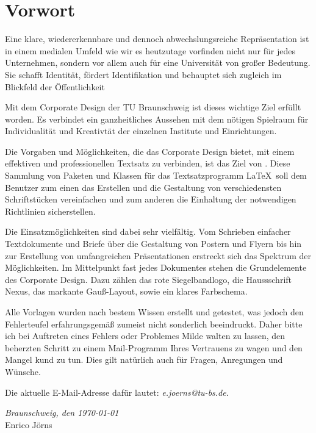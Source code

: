 \chapter*{Vorwort}

Eine klare, wiedererkennbare und dennoch abwechslungsreiche
Repräsentation ist in einem medialen Umfeld wie wir es heutzutage
vorfinden nicht nur für jedes Unternehmen, sondern vor allem auch
für eine Universität von großer Bedeutung.
Sie schafft Identität, fördert Identifikation und behauptet sich zugleich im 
Blickfeld der Öffentlichkeit

Mit dem Corporate Design der TU Braunschweig ist dieses wichtige Ziel
erfüllt worden. Es verbindet ein ganzheitliches Aussehen mit dem nötigen
Spielraum für Individualität und Kreativtät der einzelnen Institute und 
Einrichtungen.\bigskip


Die Vorgaben und Möglichkeiten, die das Corporate Design bietet,
mit einem effektiven und professionellen Textsatz zu verbinden, ist
das Ziel von \tubslatex. Diese Sammlung von Paketen und Klassen
für das Textsatzprogramm \LaTeX\ soll dem Benutzer zum einen das Erstellen und
die Gestaltung von verschiedensten Schriftstücken vereinfachen und zum anderen
die Einhaltung der notwendigen Richtlinien sicherstellen.

Die Einsatzmöglichkeiten sind dabei sehr vielfältig.
Vom Schrieben einfacher Textdokumente und Briefe über die Gestaltung von Postern
und Flyern bis hin zur Erstellung von umfangreichen Präsentationen erstreckt
sich das Spektrum der Möglichkeiten.
Im Mittelpunkt fast jedes Dokumentes stehen die Grundelemente des Corporate
Design. Dazu zählen das rote Siegelbandlogo, die Haussschrift Nexus,
das markante Gauß-Layout, sowie ein klares Farbschema.\bigskip


Alle Vorlagen wurden nach bestem Wissen erstellt und getestet, was
jedoch den Fehlerteufel erfahrungsgemäß zumeist nicht sonderlich beeindruckt.
Daher bitte ich bei Auftreten eines Fehlers oder Problemes Milde walten
zu lassen, den beherzten Schritt zu einem Mail-Programm Ihres Vertrauens zu
wagen und den Mangel kund zu tun. Dies gilt natürlich auch für Fragen,
Anregungen und Wünsche.

Die aktuelle E-Mail-Adresse dafür lautet: \textit{e.joerns@tu-bs.de}.

\hfill\textit{Braunschweig, den \today}\\[\bigskipamount]
\noindent Enrico Jörns

